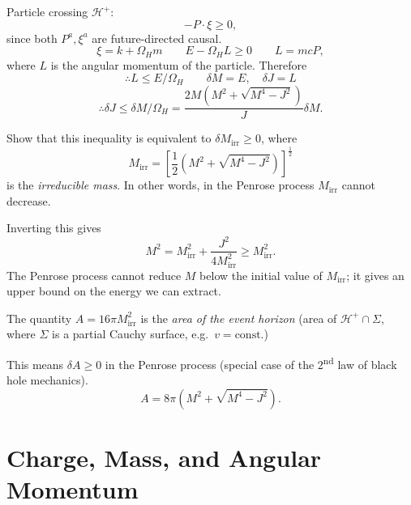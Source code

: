 Particle crossing $\mathcal{H}^+$: 
\begin{equation}
  -P \cdot \xi \geq 0, 
\end{equation}
since both $P^{a}, \xi^{a}$ are future-directed causal.
\begin{equation}
  \xi = k + \Omega_H m \qquad E - \Omega_H L \geq 0 \qquad L = m c P,
\end{equation}
where $L$ is the angular momentum of the particle. 
Therefore
\begin{equation}
  \therefore L  \leq E / \Omega_H \qquad \delta M = E, \quad \delta J = L
\end{equation}
\begin{equation}
  \therefore \delta J \leq \delta M / \Omega_H =  \frac{2 M (M^2 + \sqrt{M^4 - J^2})}{J} \delta M.
\end{equation}
\begin{exercise}
  Show that this inequality is equivalent to $\delta M_{\text{irr}} \geq 0$, where 
  \begin{equation}
    M_{\text{irr}} = \left[ \frac{1}{2} (M^2 + \sqrt{M^4 - J^2}) \right]^{\frac{1}{2}}
  \end{equation}
  is the \emph{irreducible mass}. In other words, in the Penrose process $M_{\text{irr}}$ cannot decrease.
\end{exercise}
Inverting this gives
\begin{equation}
  M^2 = M^2_{\text{irr}} + \frac{J^2}{4 M^2_{\text{irr}}} \geq M^2 _{\text{irr}}.
\end{equation}
The Penrose process cannot reduce $M$ below the initial value of $M_{\text{irr}}$; it gives an upper bound on the energy we can extract.
\begin{exercise}
  The quantity $A = 16 \pi M^2_{\text{irr}}$ is the \emph{area of the event horizon} (area of $\mathcal{H}^+ \cap \Sigma$, where $\Sigma$ is a partial Cauchy surface, e.g.~$v = \text{const.}$)
\end{exercise}
This means $\delta A \geq 0$ in the Penrose process (special case of the 2\textsuperscript{nd} law of black hole mechanics).
\begin{equation}
  A = 8 \pi (M^2 + \sqrt{M^4 - J^2}).
\end{equation}

\chapter{Charge, Mass, and Angular Momentum}%
\label{cha:charge_mass_and_angular_momentum}

